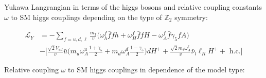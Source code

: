 \documentclass[12pt,oneside]{book}
\begin{document}
Yukawa Langrangian in terms of the higgs bosons and relative coupling constants $\omega$ to SM higgs couplings depending on the type of $\mathbb{Z}_2$ symmetry: 

\begin{align}
    \mathcal{L}_{Y} &= - \sum_{f = u, d, \ell} \frac{m_f}{v}\Bigg(\omega_{h}^{f}\bar{f}fh + \omega_{H}^{f}\bar{f}fH - \omega_{A}^{f}\bar{f}\gamma_5fA\Bigg) \\ \nonumber
                    &- \Bigg[\frac{\sqrt{2}V_{ud}}{v}\bar{u}\Bigg(m_u\omega^{u}_A\frac{1+\gamma_5}{2} + m_d\omega_A^d\frac{1-\gamma_5}{2}\Bigg)d H^{+} + \frac{\sqrt{2}m_\ell\omega^{\ell}_A}{v}\bar{\nu}_l\ell_RH^+ + \text{ h.c.}\Bigg]
\end{align}

Relative coupling $\omega$ to SM higgs couplings in dependence of the model type:
\end{document}
